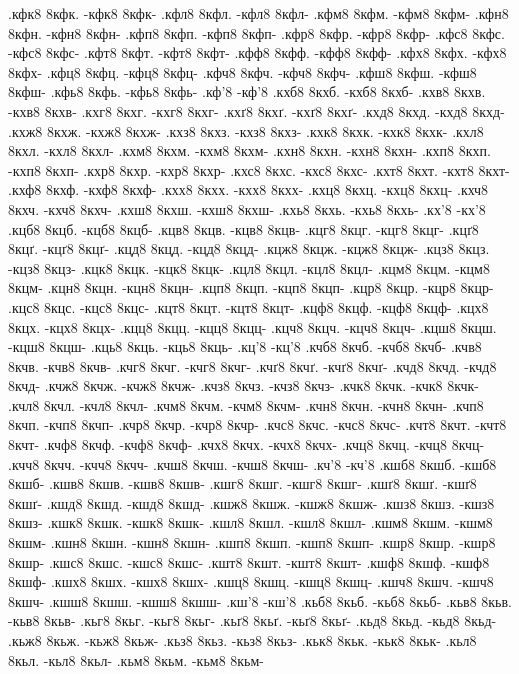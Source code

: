 {.кфк8 8кфк. -кфк8 8кфк-
.кфл8 8кфл. -кфл8 8кфл-
.кфм8 8кфм. -кфм8 8кфм-
.кфн8 8кфн. -кфн8 8кфн-
.кфп8 8кфп. -кфп8 8кфп-
.кфр8 8кфр. -кфр8 8кфр-
.кфс8 8кфс. -кфс8 8кфс-
.кфт8 8кфт. -кфт8 8кфт-
.кфф8 8кфф. -кфф8 8кфф-
.кфх8 8кфх. -кфх8 8кфх-
.кфц8 8кфц. -кфц8 8кфц-
.кфч8 8кфч. -кфч8 8кфч-
.кфш8 8кфш. -кфш8 8кфш-
.кфь8 8кфь. -кфь8 8кфь-
.кф'8 -кф'8
.кхб8 8кхб. -кхб8 8кхб-
.кхв8 8кхв. -кхв8 8кхв-
.кхг8 8кхг. -кхг8 8кхг-
.кхґ8 8кхґ. -кхґ8 8кхґ-
.кхд8 8кхд. -кхд8 8кхд-
.кхж8 8кхж. -кхж8 8кхж-
.кхз8 8кхз. -кхз8 8кхз-
.кхк8 8кхк. -кхк8 8кхк-
.кхл8 8кхл. -кхл8 8кхл-
.кхм8 8кхм. -кхм8 8кхм-
.кхн8 8кхн. -кхн8 8кхн-
.кхп8 8кхп. -кхп8 8кхп-
.кхр8 8кхр. -кхр8 8кхр-
.кхс8 8кхс. -кхс8 8кхс-
.кхт8 8кхт. -кхт8 8кхт-
.кхф8 8кхф. -кхф8 8кхф-
.кхх8 8кхх. -кхх8 8кхх-
.кхц8 8кхц. -кхц8 8кхц-
.кхч8 8кхч. -кхч8 8кхч-
.кхш8 8кхш. -кхш8 8кхш-
.кхь8 8кхь. -кхь8 8кхь-
.кх'8 -кх'8
.кцб8 8кцб. -кцб8 8кцб-
.кцв8 8кцв. -кцв8 8кцв-
.кцг8 8кцг. -кцг8 8кцг-
.кцґ8 8кцґ. -кцґ8 8кцґ-
.кцд8 8кцд. -кцд8 8кцд-
.кцж8 8кцж. -кцж8 8кцж-
.кцз8 8кцз. -кцз8 8кцз-
.кцк8 8кцк. -кцк8 8кцк-
.кцл8 8кцл. -кцл8 8кцл-
.кцм8 8кцм. -кцм8 8кцм-
.кцн8 8кцн. -кцн8 8кцн-
.кцп8 8кцп. -кцп8 8кцп-
.кцр8 8кцр. -кцр8 8кцр-
.кцс8 8кцс. -кцс8 8кцс-
.кцт8 8кцт. -кцт8 8кцт-
.кцф8 8кцф. -кцф8 8кцф-
.кцх8 8кцх. -кцх8 8кцх-
.кцц8 8кцц. -кцц8 8кцц-
.кцч8 8кцч. -кцч8 8кцч-
.кцш8 8кцш. -кцш8 8кцш-
.кць8 8кць. -кць8 8кць-
.кц'8 -кц'8
.кчб8 8кчб. -кчб8 8кчб-
.кчв8 8кчв. -кчв8 8кчв-
.кчг8 8кчг. -кчг8 8кчг-
.кчґ8 8кчґ. -кчґ8 8кчґ-
.кчд8 8кчд. -кчд8 8кчд-
.кчж8 8кчж. -кчж8 8кчж-
.кчз8 8кчз. -кчз8 8кчз-
.кчк8 8кчк. -кчк8 8кчк-
.кчл8 8кчл. -кчл8 8кчл-
.кчм8 8кчм. -кчм8 8кчм-
.кчн8 8кчн. -кчн8 8кчн-
.кчп8 8кчп. -кчп8 8кчп-
.кчр8 8кчр. -кчр8 8кчр-
.кчс8 8кчс. -кчс8 8кчс-
.кчт8 8кчт. -кчт8 8кчт-
.кчф8 8кчф. -кчф8 8кчф-
.кчх8 8кчх. -кчх8 8кчх-
.кчц8 8кчц. -кчц8 8кчц-
.кчч8 8кчч. -кчч8 8кчч-
.кчш8 8кчш. -кчш8 8кчш-
.кч'8 -кч'8
.кшб8 8кшб. -кшб8 8кшб-
.кшв8 8кшв. -кшв8 8кшв-
.кшг8 8кшг. -кшг8 8кшг-
.кшґ8 8кшґ. -кшґ8 8кшґ-
.кшд8 8кшд. -кшд8 8кшд-
.кшж8 8кшж. -кшж8 8кшж-
.кшз8 8кшз. -кшз8 8кшз-
.кшк8 8кшк. -кшк8 8кшк-
.кшл8 8кшл. -кшл8 8кшл-
.кшм8 8кшм. -кшм8 8кшм-
.кшн8 8кшн. -кшн8 8кшн-
.кшп8 8кшп. -кшп8 8кшп-
.кшр8 8кшр. -кшр8 8кшр-
.кшс8 8кшс. -кшс8 8кшс-
.кшт8 8кшт. -кшт8 8кшт-
.кшф8 8кшф. -кшф8 8кшф-
.кшх8 8кшх. -кшх8 8кшх-
.кшц8 8кшц. -кшц8 8кшц-
.кшч8 8кшч. -кшч8 8кшч-
.кшш8 8кшш. -кшш8 8кшш-
.кш'8 -кш'8
.кьб8 8кьб. -кьб8 8кьб-
.кьв8 8кьв. -кьв8 8кьв-
.кьг8 8кьг. -кьг8 8кьг-
.кьґ8 8кьґ. -кьґ8 8кьґ-
.кьд8 8кьд. -кьд8 8кьд-
.кьж8 8кьж. -кьж8 8кьж-
.кьз8 8кьз. -кьз8 8кьз-
.кьк8 8кьк. -кьк8 8кьк-
.кьл8 8кьл. -кьл8 8кьл-
.кьм8 8кьм. -кьм8 8кьм-
}
